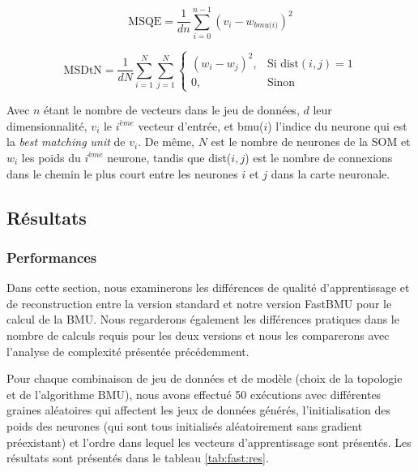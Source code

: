 	\begin{equation}
		\text{MSQE} = \frac{1}{dn} \sum_{i=0}^{n-1} (v_i - w_\textit{bmu(i)})^2
	\end{equation}

	\begin{equation}
    	\text{MSDtN} = \frac{1}{dN} \sum_{i=1}^{N} \sum_{j=1}^{N} 
    	\begin{cases}
        	(w_i - w_j)^2,  & \text{Si dist}(i, j) = 1\\
        	0,              & \text{Sinon}
    	\end{cases}
	\end{equation}

	Avec $n$ étant le nombre de vecteurs dans le jeu de données, $d$ leur dimensionnalité, $v_i$ le $i^{ème}$ vecteur d'entrée, et bmu($i$) l'indice du neurone qui est la \textit{best matching unit} de $v_i$. De même, $N$ est le nombre de neurones de la SOM et $w_i$ les poids du $i^{ème}$ neurone, tandis que dist($i, j$) est le nombre de connexions dans le chemin le plus court entre les neurones $i$ et $j$ dans la carte neuronale.

	\subsection{Résultats}
	\subsubsection{Performances}

	Dans cette section, nous examinerons les différences de qualité d'apprentissage et de reconstruction entre la version standard et notre version FastBMU pour le calcul de la BMU. Nous regarderons également les différences pratiques dans le nombre de calculs requis pour les deux versions et nous les comparerons avec l'analyse de complexité présentée précédemment.

	Pour chaque combinaison de jeu de données et de modèle (choix de la topologie et de l'algorithme BMU), nous avons effectué 50 exécutions avec différentes graines aléatoires qui affectent les jeux de données générés, l'initialisation des poids des neurones (qui sont tous initialisés aléatoirement sans gradient préexistant) et l'ordre dans lequel les vecteurs d'apprentissage sont présentés. Les résultats sont présentés dans le tableau \ref{tab:fast:res}.

